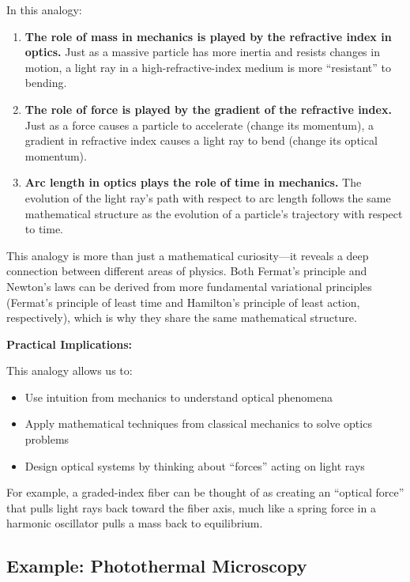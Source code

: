 \documentclass[
  a4paper,
]{book}
\providecommand{\tightlist}{%
  \setlength{\itemsep}{0pt}\setlength{\parskip}{0pt}}
\begin{document}
\begin{tcolorbox}
In this analogy:

\begin{enumerate}
\def\labelenumi{\arabic{enumi}.}
\item
  \textbf{The role of mass in mechanics is played by the refractive
  index in optics.} Just as a massive particle has more inertia and
  resists changes in motion, a light ray in a high-refractive-index
  medium is more ``resistant'' to bending.
\item
  \textbf{The role of force is played by the gradient of the refractive
  index.} Just as a force causes a particle to accelerate (change its
  momentum), a gradient in refractive index causes a light ray to bend
  (change its optical momentum).
\item
  \textbf{Arc length in optics plays the role of time in mechanics.} The
  evolution of the light ray's path with respect to arc length follows
  the same mathematical structure as the evolution of a particle's
  trajectory with respect to time.
\end{enumerate}

This analogy is more than just a mathematical curiosity---it reveals a
deep connection between different areas of physics. Both Fermat's
principle and Newton's laws can be derived from more fundamental
variational principles (Fermat's principle of least time and Hamilton's
principle of least action, respectively), which is why they share the
same mathematical structure.

\textbf{Practical Implications:}

This analogy allows us to:

\begin{itemize}
\tightlist
\item
  Use intuition from mechanics to understand optical phenomena
\item
  Apply mathematical techniques from classical mechanics to solve optics
  problems
\item
  Design optical systems by thinking about ``forces'' acting on light
  rays
\end{itemize}

For example, a graded-index fiber can be thought of as creating an
``optical force'' that pulls light rays back toward the fiber axis, much
like a spring force in a harmonic oscillator pulls a mass back to
equilibrium.

\end{tcolorbox}

\subsection{Example: Photothermal
Microscopy}\label{example-photothermal-microscopy}
\end{document}
